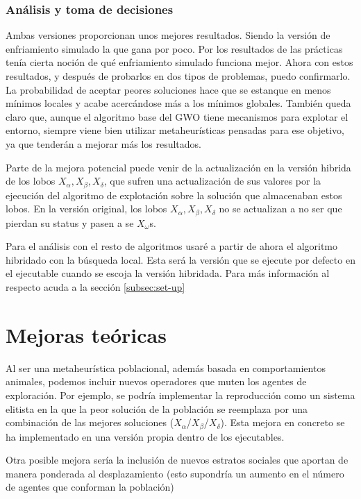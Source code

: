 \documentclass[a4paper]{report}
\begin{document}
\subsubsection*{Análisis y toma de decisiones}
Ambas versiones proporcionan unos mejores resultados. Siendo la versión de enfriamiento simulado la que gana por poco. Por los resultados de las prácticas tenía cierta noción de qué enfriamiento simulado funciona mejor. Ahora con estos resultados, y después de probarlos en dos tipos de problemas, puedo confirmarlo. La probabilidad de aceptar peores soluciones hace que se estanque en menos mínimos locales y acabe acercándose más a los mínimos globales. También queda claro que, aunque el algoritmo base del GWO tiene mecanismos para explotar el entorno, siempre viene bien utilizar metaheurísticas pensadas para ese objetivo, ya que tenderán a mejorar más los resultados.

Parte de la mejora potencial puede venir de la actualización en la versión hibrida de los lobos $X_\alpha,X_\beta,X_\delta$, que sufren una actualización de sus valores por la ejecución del algoritmo de explotación sobre la solución que almacenaban estos lobos. En la versión original, los lobos $X_\alpha,X_\beta,X_\delta$ no se actualizan a no ser que pierdan su status y pasen a se $X_\omega$s.

Para el análisis con el resto de algoritmos usaré a partir de ahora el algoritmo hibridado con la búsqueda local. Esta será la versión que se ejecute por defecto en el ejecutable cuando se escoja la versión hibridada. Para más información al respecto acuda a la sección \ref{subsec:set-up}



\section{Mejoras teóricas}
Al ser una metaheurística poblacional, además basada en comportamientos animales, podemos incluir nuevos operadores que muten los agentes de exploración. Por ejemplo, se podría implementar la reproducción como un sistema elitista en la que la peor solución de la población se reemplaza por una combinación de las mejores soluciones ($X_\alpha$/$X_\beta$/$X_\delta$). Esta mejora en concreto se ha implementado en una versión propia dentro de los ejecutables.


Otra posible mejora sería la inclusión de nuevos estratos sociales que aportan de manera ponderada al desplazamiento (esto supondría un aumento en el número de agentes que conforman la población)
\end{document}
